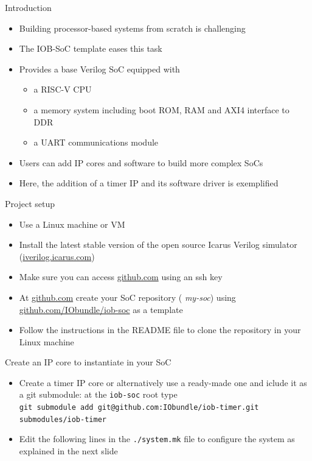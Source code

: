 \documentclass [xcolor=svgnames, t] {beamer}
\begin{document}
\begin{frame}{Introduction}
\begin{center}
    \begin{itemize}
      \item Building processor-based systems from scratch is challenging
      \item The IOB-SoC template eases this task
      \item Provides a base Verilog SoC equipped with
        \begin{itemize}
        \item a RISC-V CPU
        \item a memory system including boot ROM, RAM and AXI4 interface to DDR
        \item a UART communications module
        \end{itemize}
      \item Users can add IP cores and software to build more complex SoCs
      \item Here, the addition of a timer IP and its software driver is exemplified
    \end{itemize}
\end{center}
\end{frame}

\begin{frame}{Project setup}
\begin{center}
  \begin{itemize}
    \item Use a Linux machine or VM
    \item Install the latest stable version of the open source Icarus Verilog simulator (\url{iverilog.icarus.com})
    \item Make sure you can access \url{github.com} using an ssh key
    \item At \url{github.com} create your SoC repository ({\it
      my-soc}) using \url{github.com/IObundle/iob-soc} as a
      template
    \item Follow the instructions in the README file to clone the repository in your Linux machine
  \end{itemize}
\end{center}
\end{frame}


\begin{frame}{Create an IP core to instantiate in your SoC}
\begin{itemize}
\item Create a timer IP core or alternatively use a ready-made one and iclude it as a git submodule: at the {\tt iob-soc} root type
  \\{\fontsize{7pt}{10pt} \tt git submodule add git@github.com:IObundle/iob-timer.git submodules/iob-timer}
\item Edit the following lines in the {\tt ./system.mk} file to configure the system as explained in the next slide
\end{itemize}
\end{frame}
\end{document}
